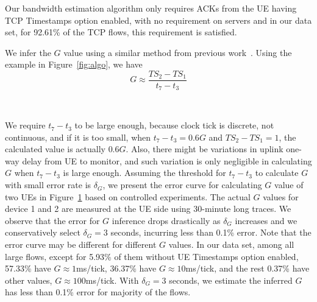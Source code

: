 Our bandwidth estimation algorithm only requires ACKs from the UE having TCP Timestamps option enabled, with no requirement on servers and in our data set, for 92.61\% of the TCP flows, this requirement is satisfied.

We infer the $G$ value using a similar method from previous work~\cite{imc.ttfb}. Using the example in Figure~\ref{fig:algo}, we have
\begin{equation}
\label{eq:g}
G \approx \frac{TS_{2} - TS_{1}}{t_{7}-t_{3}}
\end{equation}

\begin{figure}[t]
\centering
{}\\
\label{fig:g}
\end{figure}


We require $t_{7} - t_{3}$ to be large enough, because clock tick is discrete, not continuous, and if it is too small, \eg when $t_{7} - t_{3} = 0.6G$ and $TS_{2} - TS_{1} = 1$, the calculated value is actually $0.6G$. Also, there might be variations in uplink one-way delay from UE to monitor, and such variation is only negligible in calculating $G$ when $t_{7} - t_{3}$ is large enough. Assuming the threshold for $t_{7} - t_{3}$ to calculate $G$ with small error rate is $\delta_{G}$, we present the error curve for calculating $G$ value of two UEs in Figure~\ref{fig:g} based on controlled experiments. The actual $G$ values for device 1 and 2 are measured at the UE side using 30-minute long traces. We observe that the error for $G$ inference drops drastically as $\delta_{G}$ increases and we conservatively select $\delta_{G} = 3$ seconds, incurring less than 0.1\% error. Note that the error curve may be different for different $G$ values. In our data set, among all large flows, except for 5.93\% of them without UE Timestamps option enabled, 57.33\% have $G\approx 1$ms/tick,  36.37\% have $G\approx 10$ms/tick, and the rest 0.37\% have other values, \eg $G\approx 100$ms/tick. With $\delta_{G} = 3$ seconds, we estimate the inferred $G$ has less than 0.1\% error for majority of the flows.

